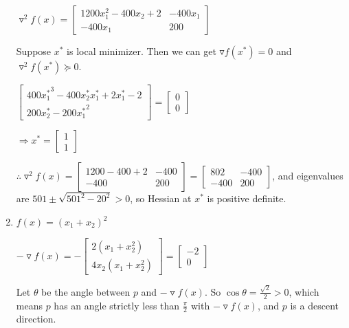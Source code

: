 \documentclass[12pt]{article}
\begin{document}
\begin{enumerate}
$\triangledown^2 f(x) = \begin{bmatrix} 1200 x_1^2 - 400 x_2 + 2 & -400x_1 \\ -400x_1 & 200 \end{bmatrix}$

Suppose $x^*$ is local minimizer. Then we can get $\triangledown f(x^*) = 0$ and $\triangledown^2 f(x^*) \succeq 0$.

$\begin{bmatrix} 400 {x_1^*}^3 - 400 {x_2^*} {x_1^*} + 2 {x_1^*} - 2 \\ 200 {x_2^*} - 200 {x_1^*} ^ 2 \end{bmatrix} = \begin{bmatrix} 0 \\ 0 \end{bmatrix}$

$\Longrightarrow x^* = \begin{bmatrix} 1 \\ 1 \end{bmatrix} $

$\therefore \triangledown^2 f(x) = \begin{bmatrix} 1200 - 400 + 2 & -400 \\ -400 & 200 \end{bmatrix} = \begin{bmatrix} 802 & -400 \\ -400 & 200 \end{bmatrix}$, and eigenvalues are $501 \pm \sqrt{501^2 - 20^2} > 0$, so Hessian at $x^*$ is positive definite.










\bigskip
\item

$f(x) = (x_1+x_2)^2$

$ - \triangledown f(x) = - \begin{bmatrix} 2(x_1+x_2^2) \\ 4x_2(x_1+x_2^2) \end{bmatrix}= \begin{bmatrix} -2 \\ 0 \end{bmatrix}$

Let $\theta$ be the angle between $p$ and $-\triangledown f(x)$. So $\cos \theta = \frac{\sqrt{2}}{2} > 0$, which means $p$ has an angle strictly less than $\frac{\pi}{2}$ with $-\triangledown f(x)$, and $p$ is a descent direction.


\end{enumerate}
\end{document}
